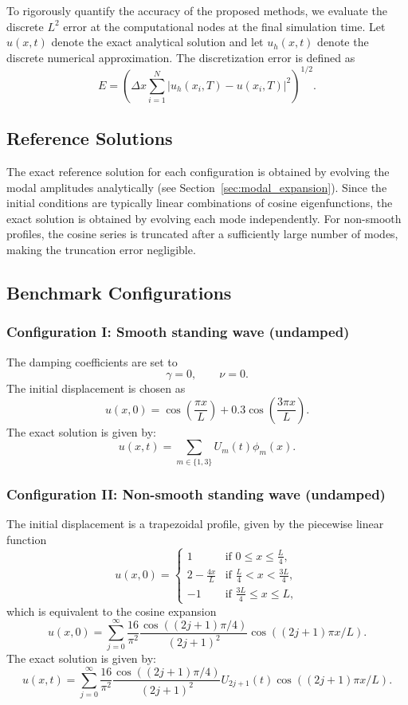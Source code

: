 \documentclass{Configuration_Files/PoliMi3i_thesis}
\begin{document}
To rigorously quantify the accuracy of the proposed methods, we evaluate the discrete $L^2$ error at the computational nodes at the final simulation time. Let $u(x,t)$ denote the exact analytical solution and let $u_h(x,t)$ denote the discrete numerical approximation. The discretization error is defined as
\[
E
=
\left(
\Delta x
\sum_{i=1}^N
|u_h(x_i,T)-u(x_i,T)|^2
\right)^{1/2}.
\]

\subsection{Reference Solutions}
The exact reference solution for each configuration is obtained by evolving the modal amplitudes analytically (see Section~\ref{sec:modal_expansion}). Since the initial conditions are typically linear combinations of cosine eigenfunctions, the exact solution is obtained by evolving each mode independently. For non-smooth profiles, the cosine series is truncated after a sufficiently large number of modes, making the truncation error negligible.

\subsection{Benchmark Configurations}
\subsubsection{Configuration I: Smooth standing wave (undamped)}
The damping coefficients are set to
\[
\gamma=0,\qquad \nu=0.
\]
The initial displacement is chosen as
\[
u(x,0)
=
\cos\!\left(\frac{\pi x}{L}\right)
+
0.3\cos\!\left(\frac{3\pi x}{L}\right).
\]
The exact solution is given by:
\[
u(x,t)
=
\sum_{m\in\{1,3\}}
U_m(t)\phi_m(x).
\]

\subsubsection{Configuration II: Non-smooth standing wave (undamped)}
The initial displacement is a trapezoidal profile, given by the piecewise linear function
\[
u(x,0) = 
\begin{cases}
1 & \text{if } 0 \le x \le \frac{L}{4}, \\[4pt]
2 - \frac{4x}{L} & \text{if } \frac{L}{4} < x < \frac{3L}{4}, \\[4pt]
-1 & \text{if } \frac{3L}{4} \le x \le L,
\end{cases}
\]
which is equivalent to the cosine expansion
\[
u(x,0)
=
\sum_{j=0}^{\infty}
\frac{16}{\pi^2} \frac{\cos\left((2j+1)\pi/4\right)}{(2j+1)^2}
\cos\left((2j+1)\pi x/L\right).
\]
The exact solution is given by:
\[
u(x,t)
=
\sum_{j=0}^{\infty}
\frac{16}{\pi^2} \frac{\cos\left((2j+1)\pi/4\right)}{(2j+1)^2}
U_{2j+1}(t)\cos\left((2j+1)\pi x/L\right).
\]
\end{document}
